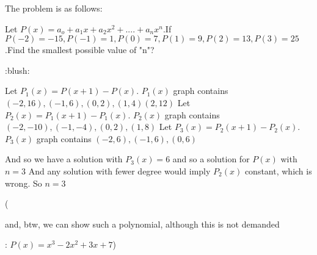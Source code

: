\begin{solution}
	\begin{tcolorbox}The problem is as follows:\begin{bolded}Let $ P(x) = a_o + a_1x + a_2x^2 + .... + a_nx^n$.If $ P( - 2) = - 15,P( - 1) = 1,P(0) = 7,P(1) = 9,P(2) = 13,P(3) = 25$ .Find the smallest possible value of "n"?\end{bolded} :blush:\end{tcolorbox}

Let $ P_1(x) = P(x + 1) - P(x)$. $ P_1(x)$ graph contains $ ( - 2,16),( - 1,6),(0,2),(1,4)(2,12)$
Let $ P_2(x) = P_1(x + 1) - P_1(x)$. $ P_2(x)$ graph contains $ ( - 2, - 10),( - 1, - 4),(0,2),(1,8)$
Let $ P_3(x) = P_2(x + 1) - P_2(x)$. $ P_3(x)$ graph contains $ ( - 2,6),( - 1,6),(0,6)$

And so we have a solution with $ P_3(x) = 6$ and so a solution for $ P(x)$ with $ n = 3$
And any solution with fewer degree would imply $ P_2(x)$ constant, which is wrong.
So $ \boxed{n = 3}$

(\begin{italicized}and, btw, we can show such a polynomial, although this is not demanded \end{italicized}: $ P(x)=x^3-2x^2+3x+7$)
\end{solution}



